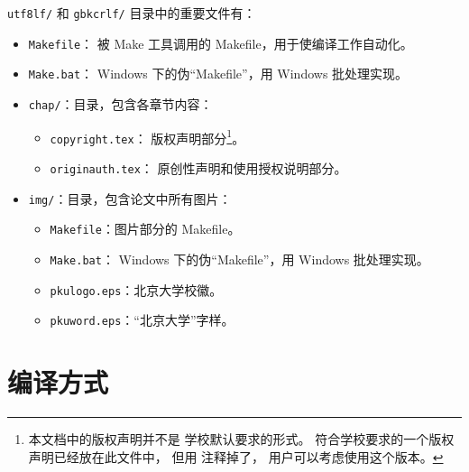 	\verb|utf8lf/| 和 \verb|gbkcrlf/| 目录中的重要文件有：
	\begin{itemize}
		\item \verb|Makefile|：
			被 Make 工具调用的 Makefile，用于使编译工作自动化。
		\item \verb|Make.bat|：%
			Windows 下的伪“Makefile”，用 Windows 批处理实现。

		\item \verb|chap/|：目录，包含各章节内容：
		\begin{itemize}
			\item \verb|copyright.tex|：
				版权声明部分\footnote{%
					本文档中的版权声明并不是%
					学校默认要求的形式\supercite{pku-copyright}。
					符合学校要求的一个版权声明已经放在此文件中，
					但用 \texttt{\string\iffalse{} ...\ \string\fi} %
					注释掉了，
					用户可以考虑使用这个版本。
				}。
			\item \verb|originauth.tex|：
				原创性声明和使用授权说明部分\supercite{pku-originauth}。
		\end{itemize}

		\item \verb|img/|：目录，包含论文中所有图片：
		\begin{itemize}
			\item \verb|Makefile|：图片部分的 Makefile。
			\item \verb|Make.bat|：%
				Windows 下的伪“Makefile”，用 Windows 批处理实现。
			\item \verb|pkulogo.eps|：北京大学校徽。
			\item \verb|pkuword.eps|：“北京大学”字样。
		\end{itemize}
	\end{itemize}

	\section{编译方式}\label{sec:compile}

